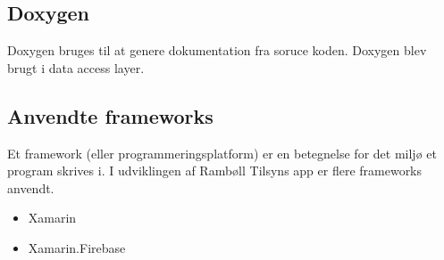 \subsection*{Doxygen}
Doxygen \cite{DoxygenInfo} bruges til at genere dokumentation fra soruce koden. Doxygen blev brugt i data access layer.   

\clearpage

\subsection*{Anvendte frameworks} 
Et framework (eller programmeringsplatform) er en betegnelse for det miljø 
et program skrives i. I udviklingen af Rambøll Tilsyns app
er flere frameworks anvendt.
\begin{itemize}[-]
	\item Xamarin \cite{XamarinDoc}
	\item Xamarin.Firebase \cite{FirebaseDoc}
	
	
\end{itemize}
